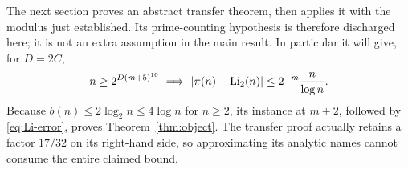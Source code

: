 The next section proves an abstract transfer theorem, then applies it
with the modulus just established. Its prime-counting hypothesis is
therefore discharged here; it is not an extra assumption in the main
result. In particular it will give, for $D=2C$,
\[
 n\ge2^{D(m+5)^{10}}\ \Longrightarrow\
 |\pi(n)-\operatorname{Li}_2(n)|\le2^{-m}\frac n{\log n}.
\]
Because $b(n)\le2\log_2n\le4\log n$ for $n\ge2$, its instance at
$m+2$, followed by \eqref{eq:Li-error}, proves
Theorem~\ref{thm:object}. The transfer proof actually retains a factor
$17/32$ on its right-hand side, so approximating its analytic names
cannot consume the entire claimed bound.
